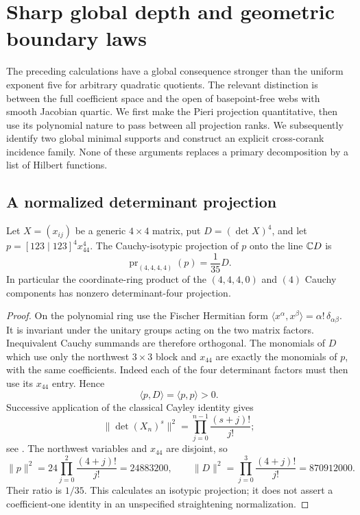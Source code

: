 \section{Sharp global depth and geometric boundary laws}
\label{sec:sharp-global-laws}

The preceding calculations have a global consequence stronger than the
uniform exponent five for arbitrary quadratic quotients.  The relevant
distinction is between the full coefficient space and the open of
basepoint-free webs with smooth Jacobian quartic.  We first make the
Pieri projection quantitative, then use its polynomial nature to pass
between all projection ranks.  We subsequently identify two global
minimal supports and construct an explicit cross-corank incidence
family.  None of these arguments replaces a primary decomposition by a
list of Hilbert functions.

\subsection{A normalized determinant projection}

\begin{lemma}
\label{lem:fischer-determinant-projection}
Let \(X=(x_{ij})\) be a generic \(4\times4\) matrix, put
\(D=(\det X)^4\), and let
\(p=[123\mid123]^4x_{44}^4\).  The Cauchy-isotypic projection of
\(p\) onto the line \(\mathbb C D\) is
\[
 \operatorname{pr}_{(4,4,4,4)}(p)=\frac1{35}D.
\]
In particular the coordinate-ring product of the \((4,4,4,0)\)
and \((4)\) Cauchy components has nonzero determinant-four projection.
\end{lemma}
\begin{proof}
On the polynomial ring use the Fischer Hermitian form
\(\langle x^\alpha,x^\beta\rangle=\alpha!\,\delta_{\alpha\beta}\).
It is invariant under the unitary groups acting on the two matrix
factors.  Inequivalent Cauchy summands are therefore orthogonal.
The monomials of \(D\) which use only the northwest \(3\times3\)
block and \(x_{44}\) are exactly the monomials of \(p\), with the
same coefficients.  Indeed each of the four determinant factors must
then use its \(x_{44}\) entry.  Hence
\[
 \langle p,D\rangle=\langle p,p\rangle>0.
\]
Successive application of the classical Cayley identity gives
\[
 \|\det(X_n)^s\|^2
 =\prod_{j=0}^{n-1}\frac{(s+j)!}{j!};
\]
see \cite{CSSCayley}.  The northwest variables and \(x_{44}\) are
disjoint, so
\[
 \|p\|^2=24\prod_{j=0}^{2}\frac{(4+j)!}{j!}=24883200,
 \qquad
 \|D\|^2=\prod_{j=0}^{3}\frac{(4+j)!}{j!}=870912000.
\]
Their ratio is \(1/35\).  This calculates an isotypic projection;
it does not assert a coefficient-one identity in an unspecified
straightening normalization.
\end{proof}

